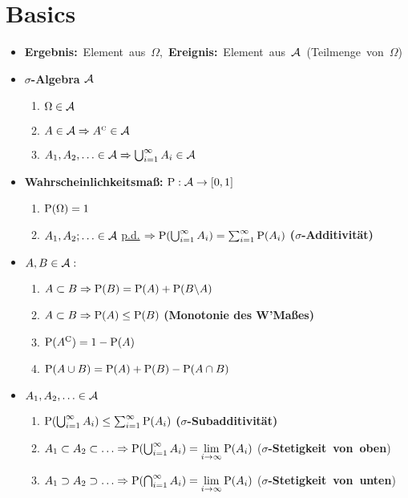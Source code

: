 \section{Basics}

\begin{itemize}
\item \mbox{\textbf{Ergebnis:} Element aus $\Omega$, 
\textbf{Ereignis: } Element aus $\A$ (Teilmenge von $\Omega$)}

\item \textbf{$\sigma$-Algebra $\A$}
	\begin{enumerate}
	\item $\Omega\in\A$
	\item $A\in\A \Rightarrow \compl{A}\in\A$
	\item $A_1, A_2,\ldots\in\A \Rightarrow \bigcup_{i=1}^{\infty} A_i \in\A$
	\end{enumerate}
	
\item \textbf{Wahrscheinlichkeitsmaß:} $\P:\A\rightarrow [0,1]$
	\begin{enumerate}
	\item $\P(\Omega)=1$
	\item $A_1,A_2;\ldots\in\A$ \underline{p.d.} 
	$\Rightarrow \P(\bigcup_{i=1}^{\infty} A_i)
	= \sum_{i=1}^{\infty}\P(A_i)$ \hfill\textbf{($\sigma$-Additivität)}
	\end{enumerate}

\item $A,B\in\A:$
	\begin{enumerate}
	\item $A\subset B \Rightarrow \P(B)=\P(A)+\P(B\backslash A)$
	\item $A\subset B \Rightarrow \P(A)\leq\P(B)$
	\hfill\textbf{(Monotonie des W'Maßes)}
	\item $\P(A^{\text{C}})=1-\P(A)$
	\item $\P(A\cup B) = \P(A)+\P(B)-\P(A\cap B)$
	\end{enumerate}
	
\item $A_1,A_2,\ldots\in\A$
	\begin{enumerate}
	\item $\P(\bigcup_{i=1}^{\infty} A_i)\leq\sum_{i=1}^{\infty} \P(A_i)$ 
	\hfill\textbf{($\sigma$-Subadditivität)}
	\item $A_1\subset A_2\subset\ldots \Rightarrow 
	\P(\bigcup_{i=1}^{\infty} A_i)=\lim\limits_{i\to\infty} \P(A_i)$
	\hfill\mbox{(\textbf{$\sigma$-Stetigkeit von oben})}
	\item $A_1 \supset A_2\supset\ldots \Rightarrow
	\P(\bigcap_{i=1}^{\infty} A_i)=\lim\limits_{i\to\infty} \P(A_i)$
	\hfill\mbox{(\textbf{$\sigma$-Stetigkeit von unten})}
	\end{enumerate}


\end{itemize}
